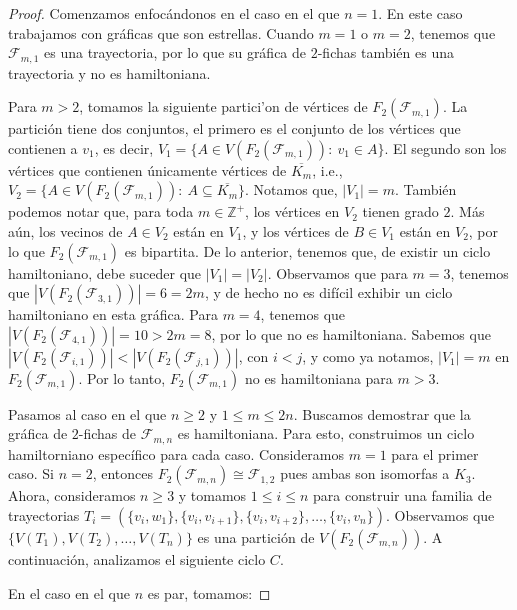 \begin{proof}
    Comenzamos enfoc\'andonos en el caso en el que $n=1$. En este caso
    trabajamos con gr\'aficas que son estrellas. Cuando $m=1$ o $m=2$, tenemos
    que $\mathcal{F}_{m,1}$ es una trayectoria, por lo que su gr\'afica de
    $2$-fichas tambi\'en es una trayectoria y no es hamiltoniana. 
    
    Para $m > 2$, tomamos la siguiente partici'on de v\'ertices de
    $F_2(\mathcal{F}_{m,1})$. La partici\'on tiene dos conjuntos, el primero es
    el conjunto de los v\'ertices que contienen a $v_1$, es decir, $V_1=\{A \in
    V(F_2(\mathcal{F}_{m,1})) \colon\ v_1 \in A\}$. El segundo son los
    v\'ertices que contienen \'unicamente v\'ertices de $\overline{K_m}$, i.e.,
    $V_2=\{A \in V(F_2(\mathcal{F}_{m,1})) \colon\ A \subseteq \overline{K_m}
    \}$. Notamos que, $|V_1|=m$. Tambi\'en podemos notar que, para toda $m \in
    \mathbb{Z^+}$, los v\'ertices en $V_2$ tienen grado $2$. M\'as a\'un, los
    vecinos de $A \in V_2$ est\'an en $V_1$, y los v\'ertices de $B \in V_1$
    est\'an en $V_2$, por lo que $F_2(\mathcal{F}_{m,1})$ es bipartita. De lo
    anterior, tenemos que, de existir un ciclo hamiltoniano, debe suceder que
    $|V_1| = |V_2|$. Observamos que para $m=3$, tenemos que
    $|V(F_2(\mathcal{F}_{3,1}))| = 6 = 2m$, y de hecho no es dif\'icil exhibir
    un ciclo hamiltoniano en esta gr\'afica. Para $m=4$, tenemos que
    $|V(F_2(\mathcal{F}_{4,1}))| = 10 > 2m=8$, por lo que no es hamiltoniana.
    Sabemos que $|V(F_2(\mathcal{F}_{i,1}))| < |V(F_2(\mathcal{F}_{j,1}))|$, con
    $i<j$, y como ya notamos, $|V_1| = m$ en $F_2(\mathcal{F}_{m,1})$.   Por lo
    tanto, $F_2(\mathcal{F}_{m,1})$ no es hamiltoniana para $m >3$.

    Pasamos al caso en el que $n \geq 2$ y $1 \leq m \leq 2n$. Buscamos
    demostrar que la gr\'afica de $2$-fichas de $\mathcal{F}_{m,n}$ es
    hamiltoniana. Para esto, construimos un ciclo hamiltorniano espec\'ifico
    para cada caso. Consideramos $m=1$ para el primer caso. Si $n=2$, entonces
    $F_2(\mathcal{F}_{m,n}) \cong \mathcal{F}_{1,2}$ pues ambas son isomorfas a
    $K_3$. Ahora, consideramos $n \geq 3$ y tomamos $1 \leq i \leq n$ para
    construir una familia de trayectorias
    $T_i=(\{v_i,w_1\},\{v_i,v_{i+1}\},\{v_i,v_{i+2}\},\dots, \{v_i,v_n\})$.
    Observamos que $\{V(T_1),V(T_2),\dots, V(T_n)\}$ es una partici\'on de
    $V(F_2(\mathcal{F}_{m,n}))$. A continuaci\'on, analizamos el siguiente ciclo
    $C$.
    
    En el caso en el que $n$ es par, tomamos:


\end{proof}
